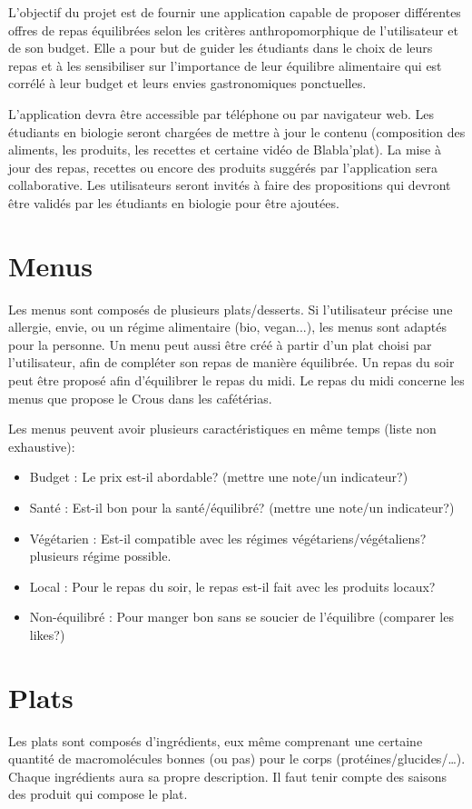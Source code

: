 L'objectif du projet est de fournir une application capable de proposer différentes offres de repas équilibrées selon les critères anthropomorphique de l'utilisateur et de son budget. 
Elle a pour but de guider les étudiants dans le choix de leurs repas et à les sensibiliser sur l'importance de leur équilibre alimentaire qui est corrélé à leur budget et leurs envies gastronomiques ponctuelles.


L'application devra être accessible par téléphone ou par navigateur web. Les étudiants en biologie seront chargées de mettre à jour le contenu (composition des aliments, les produits, les recettes et certaine vidéo de Blabla'plat).
La mise à jour des repas, recettes ou encore des produits suggérés par l'application sera collaborative. Les utilisateurs seront invités à faire des propositions qui devront être validés par les étudiants en biologie pour être ajoutées.

\section{Menus}

Les menus sont composés de plusieurs plats/desserts. Si l'utilisateur précise une allergie, envie, ou un régime alimentaire (bio, vegan...), les menus sont adaptés pour la personne. Un menu peut aussi être créé à partir d'un plat choisi par l'utilisateur, afin de compléter son repas de manière équilibrée. Un repas du soir peut être proposé afin d'équilibrer le repas du midi. Le repas du midi concerne les menus que propose le Crous dans les cafétérias.

Les menus peuvent avoir plusieurs caractéristiques en même temps (liste non exhaustive):
\begin{itemize}
\item Budget : Le prix est-il abordable? (mettre une note/un indicateur?)
\item Santé : Est-il bon pour la santé/équilibré? (mettre une note/un indicateur?)
\item Végétarien : Est-il compatible avec les régimes végétariens/végétaliens? plusieurs régime possible.
\item Local : Pour le repas du soir, le repas est-il fait avec les produits locaux?
\item Non-équilibré : Pour manger bon sans se soucier de l'équilibre (comparer les likes?)
\end{itemize}

\section{Plats}
Les plats sont composés d'ingrédients, eux même comprenant une certaine quantité de macromolécules bonnes (ou pas) pour le corps (protéines/glucides/…). Chaque ingrédients aura sa propre description.
Il faut tenir compte des saisons des produit qui compose le plat.

